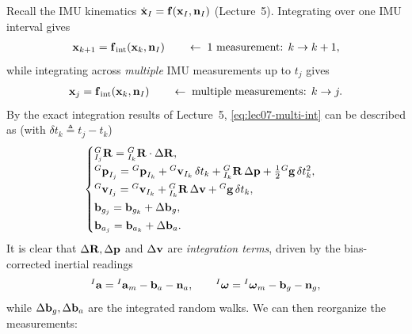 Recall the IMU kinematics $\dot{\boldsymbol{\mathbf{x}}}_I = \boldsymbol{\mathbf{f}}(\boldsymbol{\mathbf{x}}_I, \boldsymbol{\mathbf{n}}_I)$ (Lecture~5). Integrating over one IMU interval gives
\begin{align}
\boldsymbol{\mathbf{x}}_{k+1} = \boldsymbol{\mathbf{f}}_{\mathrm{int}}(\boldsymbol{\mathbf{x}}_k, \boldsymbol{\mathbf{n}}_I)
\qquad\leftarrow\;\text{1 measurement: } k \to k+1,
\end{align}
while integrating across \emph{multiple} IMU measurements up to $t_j$ gives
\begin{align}
\boldsymbol{\mathbf{x}}_j = \boldsymbol{\mathbf{f}}_{\mathrm{int}}(\boldsymbol{\mathbf{x}}_k, \boldsymbol{\mathbf{n}}_I)
\qquad\leftarrow\;\text{multiple measurements: } k \to j.
\label{eq:lec07-multi-int}
\end{align}
By the exact integration results of Lecture~5, \eqref{eq:lec07-multi-int} can be described as (with $\delta t_k \triangleq t_j - t_k$)
\begin{align}
\begin{cases}
{}^{G}_{I_j}\boldsymbol{\mathbf{R}} = {}^{G}_{I_k}\boldsymbol{\mathbf{R}}\cdot\Delta\boldsymbol{\mathbf{R}}, \\[2pt]
{}^{G}\boldsymbol{\mathbf{p}}_{I_j} = {}^{G}\boldsymbol{\mathbf{p}}_{I_k} + {}^{G}\boldsymbol{\mathbf{v}}_{I_k}\,\delta t_k + {}^{G}_{I_k}\boldsymbol{\mathbf{R}}\,\Delta\boldsymbol{\mathbf{p}} + \frac{1}{2}{}^{G}\boldsymbol{\mathbf{g}}\,\delta t_k^2, \\[2pt]
{}^{G}\boldsymbol{\mathbf{v}}_{I_j} = {}^{G}\boldsymbol{\mathbf{v}}_{I_k} + {}^{G}_{I_k}\boldsymbol{\mathbf{R}}\,\Delta\boldsymbol{\mathbf{v}} + {}^{G}\boldsymbol{\mathbf{g}}\,\delta t_k, \\[2pt]
\boldsymbol{\mathbf{b}}_{g_j} = \boldsymbol{\mathbf{b}}_{g_k} + \Delta\boldsymbol{\mathbf{b}}_g, \\[2pt]
\boldsymbol{\mathbf{b}}_{a_j} = \boldsymbol{\mathbf{b}}_{a_k} + \Delta\boldsymbol{\mathbf{b}}_a.
\end{cases}
\label{eq:lec07-int-kj}
\end{align}
It is clear that $\Delta\boldsymbol{\mathbf{R}}, \Delta\boldsymbol{\mathbf{p}}$ and $\Delta\boldsymbol{\mathbf{v}}$ are \emph{integration terms}, driven by the bias-corrected inertial readings
\begin{align}
{}^{I}\boldsymbol{\mathbf{a}} = {}^{I}\boldsymbol{\mathbf{a}}_m - \boldsymbol{\mathbf{b}}_a - \boldsymbol{\mathbf{n}}_a,
\qquad
{}^{I}\boldsymbol{\mathbf{\omega}} = {}^{I}\boldsymbol{\mathbf{\omega}}_m - \boldsymbol{\mathbf{b}}_g - \boldsymbol{\mathbf{n}}_g,
\label{eq:lec07-imumodel}
\end{align}
while $\Delta\boldsymbol{\mathbf{b}}_g, \Delta\boldsymbol{\mathbf{b}}_a$ are the integrated random walks. We can then reorganize the measurements:
